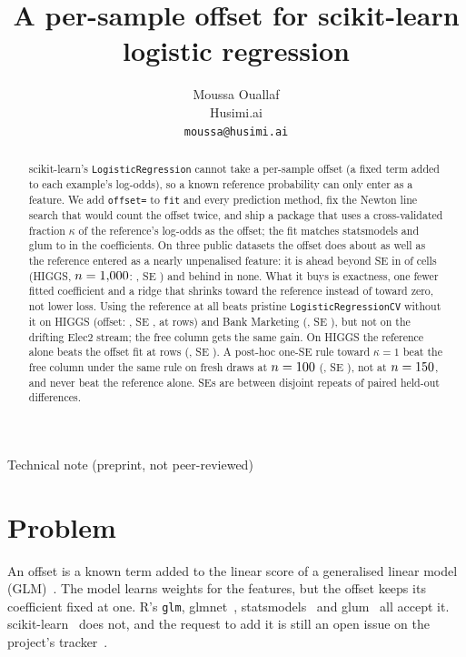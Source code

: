 \documentclass{article}
\title{A per-sample offset for scikit-learn logistic regression}
\author{%
  Moussa Ouallaf \\
  Husimi.ai \\
  \texttt{moussa@husimi.ai} \\
}
\newcommand{\code}[1]{\texttt{#1}}
\begin{document}
\maketitle
\vspace{-1.5em}
\begin{center}\small Technical note (preprint, not peer-reviewed)\end{center}

\begin{abstract}
scikit-learn's \code{LogisticRegression} cannot take a per-sample offset (a fixed term added to each example's log-odds), so a known reference probability can only enter as a feature.
We add \code{offset=} to \code{fit} and every prediction method, fix the Newton line search that would count the offset twice, and ship a package that uses a cross-validated fraction $\kappa$ of the reference's log-odds as the offset; the fit matches statsmodels and glum to \nTwinGlumCoef{} in the coefficients.
On three public datasets the offset does about as well as the reference entered as a nearly unpenalised feature: it is ahead beyond \nWinK{} SE in \nBeatKcvFree{} of \nMainCells{} cells (HIGGS, $n = 1{,}000$: \nHgOneKDKcvFree, SE \nHgOneKDKcvFreeSe) and behind in none.
What it buys is exactness, one fewer fitted coefficient and a ridge that shrinks toward the reference instead of toward zero, not lower loss.
Using the reference at all beats pristine \code{LogisticRegressionCV} without it on HIGGS (offset: \nHgTwoFiftyDKcvPlain, SE \nHgTwoFiftyDKcvPlainSe, at \nSizeTwoFifty{} rows) and Bank Marketing (\nBkTwoFiftyDKcvPlain, SE \nBkTwoFiftyDKcvPlainSe), but not on the drifting Elec2 stream; the free column gets the same gain.
On HIGGS the reference alone beats the offset fit at \nSizeTwoFifty{} rows (\nHgTwoFiftyDKcvRef, SE \nHgTwoFiftyDKcvRefSe).
A post-hoc one-SE rule toward $\kappa = 1$ beat the free column under the same rule on fresh draws at $n = 100$ (\nCfHundDFreeRule, SE \nCfHundDFreeRuleSe), not at $n = 150$, and never beat the reference alone.
SEs are between disjoint repeats of paired held-out differences.
\end{abstract}

\section{Problem}
\label{sec:problem}

An offset is a known term added to the linear score of a generalised linear model (GLM)~\citep{mccullagh1989}.
The model learns weights for the features, but the offset keeps its coefficient fixed at one.
R's \code{glm}, glmnet~\citep{friedman2010}, statsmodels~\citep{seabold2010} and glum~\citep{glum} all accept it.
scikit-learn~\citep{pedregosa2011} does not, and the request to add it is still an open issue on the project's tracker~\citep{sklearn24614}.
\end{document}

